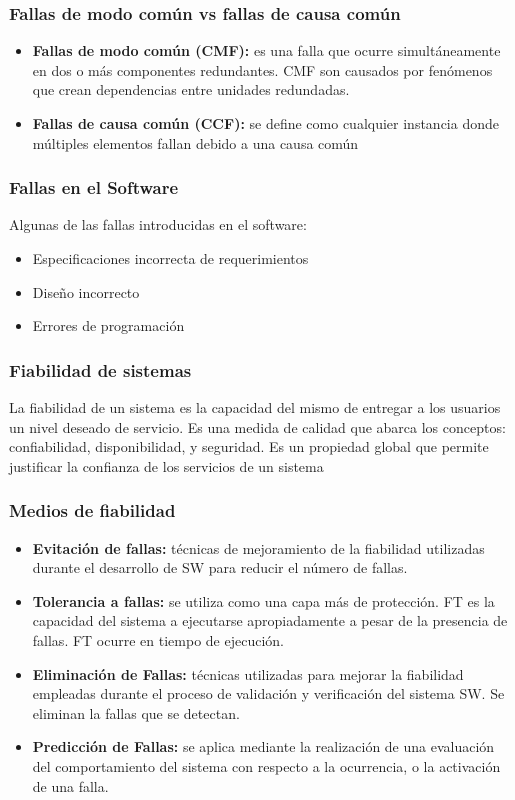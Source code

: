 \begin{frame}
	\frametitle{Fallas de modo común vs fallas de causa común}
	\begin{itemize}
		\item \textbf{Fallas de modo común (CMF):}  es una falla que ocurre simultáneamente en dos o más componentes redundantes. CMF son causados por fenómenos que crean dependencias entre unidades redundadas.
		\item \textbf{Fallas de causa común (CCF):} se define como cualquier instancia donde múltiples elementos fallan debido a una causa común
	\end{itemize}
\end{frame}

\begin{frame}
	\frametitle{Fallas en el Software}
	Algunas de las fallas introducidas en el software:
	\begin{itemize}
		\item Especificaciones incorrecta de requerimientos
		\item Diseño incorrecto
		\item Errores de programación
	\end{itemize}
\end{frame}

\begin{frame}
	\frametitle{Fiabilidad de sistemas}
	La fiabilidad de un sistema es la capacidad del mismo de entregar a los usuarios un nivel deseado de servicio. 
	\vfill
	Es una medida de calidad que abarca los conceptos: confiabilidad, disponibilidad, y seguridad.
	\vfill
	Es un propiedad global que permite justificar la confianza de los servicios de un sistema 
	
\end{frame}

\begin{frame}
	\frametitle{Medios de fiabilidad}
	\begin{itemize}
		\item \textbf{Evitación de fallas:} técnicas de mejoramiento de la fiabilidad utilizadas durante el desarrollo de SW para reducir el número de fallas.  
		\item \textbf{Tolerancia a fallas:} se utiliza como una capa más de protección. FT es la capacidad del sistema a ejecutarse apropiadamente a pesar de la presencia de fallas. FT ocurre en tiempo de ejecución.
		\item \textbf{Eliminación de Fallas:} técnicas utilizadas para mejorar la fiabilidad empleadas durante el proceso de validación y verificación del sistema SW. Se eliminan la fallas que se detectan.
		\item \textbf{Predicción de Fallas:} se aplica mediante la realización de una evaluación del comportamiento del sistema con respecto a la ocurrencia, o la activación de una falla.
	\end{itemize}
\end{frame}

